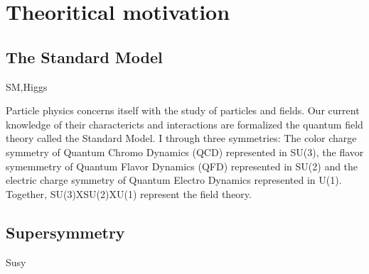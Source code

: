 \clearpage
\section{Theoritical motivation\label{sec:theory}}

\subsection{The Standard Model\label{sec:SM}}
SM,Higgs

Particle physics concerns itself with the study of particles and fields. 
Our current knowledge of their charactericts and interactions are formalized
the quantum field theory called the Standard Model.  I 
through three symmetries: The color charge symmetry of Quantum Chromo 
Dynamics (QCD) represented in SU(3), the flavor symemmetry of Quantum 
Flavor Dynamics (QFD) represented in SU(2) and the electric charge symmetry of Quantum 
Electro Dynamics represented in U(1). Together, SU(3)XSU(2)XU(1) 
represent the field theory. 

\subsection{Supersymmetry\label{sec:SUSY}}
Susy
